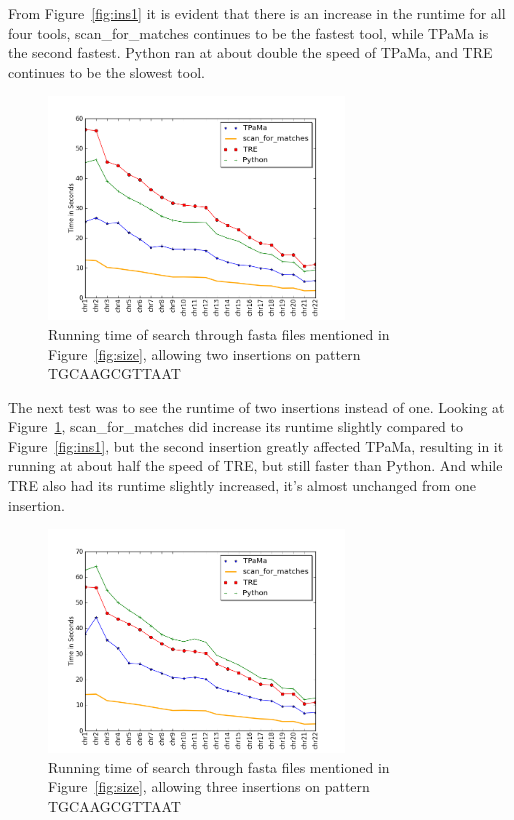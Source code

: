 From Figure~\ref{fig:ins1} it is evident that there is an increase in the runtime for all four tools, scan\_for\_matches continues to be the fastest tool, while TPaMa is the second fastest. Python ran at about double the speed of TPaMa, and TRE continues to be the slowest tool.

\begin{figure}[h!]
\centering
\includegraphics[width=0.7\textwidth]{Benchmarking/2ins.png}
\caption{Running time of search through fasta files mentioned in Figure~\ref{fig:size},  allowing two insertions on pattern TGCAAGCGTTAAT}
\label{fig:ins2}
\end{figure}

The next test was to see the runtime of two insertions instead of one. Looking at Figure~\ref{fig:ins2}, scan\_for\_matches did increase its runtime slightly compared to Figure~\ref{fig:ins1}, but the second insertion greatly affected TPaMa, resulting in it running at about half the speed of TRE, but still faster than Python.  And while TRE also had its runtime slightly increased, it's almost unchanged from one insertion.

\begin{figure}[h!]
\centering
\includegraphics[width=0.7\textwidth]{Benchmarking/3ins.png}
\caption{Running time of search through fasta files mentioned in Figure~\ref{fig:size},  allowing three insertions on pattern TGCAAGCGTTAAT}
\label{fig:ins3}
\end{figure}

